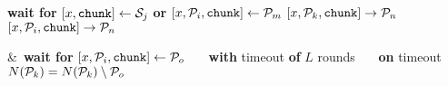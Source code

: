 \documentclass{article}
\begin{document}
\begin{algorithmic}
  \State \textbf{wait for} $[x,\mathtt{chunk}] \gets {\cal S}_j$ \textbf{or} $[x,{\cal P}_i,\mathtt{chunk}] \gets {\cal P}_m$
  \State $[x,{\cal P}_k,\mathtt{chunk}] \rightarrow {\cal P}_n$
  \EndFor
  \Else
  \State $[x,{\cal P}_i,\mathtt{chunk}] \rightarrow {\cal P}_n$
  \EndIf
  \EndFor
  \EndIf
  \EndWhile
  \EndProcedure
  
  \State \&~\textbf{wait for} $[x,{\cal P}_i,\mathtt{chunk}] \gets {\cal P}_o$
  \State ~~~\textbf{with} timeout \textbf{of} $L$ rounds
  \State ~~~\textbf{on} timeout  $N({\cal P}_k)=N({\cal P}_k) \setminus {\cal P}_o$
  \EndFor
  \EndWhile
  \EndProcedure
  
\end{algorithmic}
\end{document}
